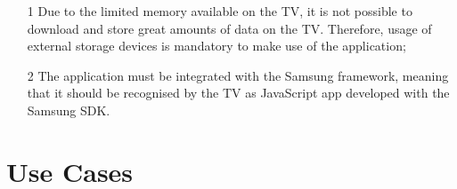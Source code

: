 \begin{itemize}
\item[1] Due to the limited memory available on the TV, it is not 
possible to download and store great amounts of data on the TV. 
Therefore, usage of external storage devices is mandatory to make use 
of the application;

\item[2] The application must be integrated with the Samsung 
framework, meaning that it should be recognised by the TV as 
JavaScript app developed with the Samsung SDK.
\end{itemize}

\section{Use Cases}
\label{sec:use_cases}
